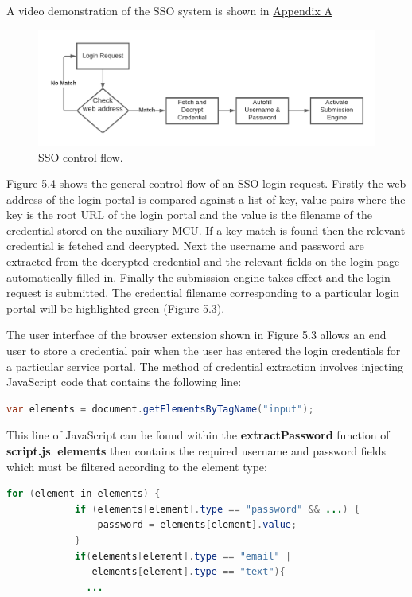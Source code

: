 A video demonstration of the SSO system is shown in \hyperref[sec:SystemOverview]{Appendix A}

\begin{figure}[H]
\centering
\includegraphics[width=0.9\columnwidth]{Figures/Fig_54.png}
\caption{SSO control flow.}
\label{fig:gantt}
\end{figure}

Figure 5.4 shows the general control flow of an SSO login request. Firstly the web address of the login portal is compared against a list of key, value pairs where the key is the root URL of the login portal and the value is the filename of the credential stored on the auxiliary MCU. If a key match is found then the relevant credential is fetched and decrypted. Next the username and password are extracted from the decrypted credential and the relevant fields on the login page automatically filled in. Finally the submission engine takes effect and the login request is submitted. The credential filename corresponding to a particular login portal will be highlighted green (Figure 5.3).

The user interface of the browser extension shown in Figure 5.3 allows an end user to store a credential pair when the user has entered the login credentials for a particular service portal. The method of credential extraction involves injecting JavaScript code that contains the following line:
\begin{lstlisting}[language=Java]
var elements = document.getElementsByTagName("input");
\end{lstlisting}

This line of JavaScript can be found within the \textbf{extractPassword} function of \textbf{script.js}.
\textbf{elements} then contains the required username and password fields which must be filtered according to the element type:
\begin{lstlisting}[language=Java]
 for (element in elements) {
            if (elements[element].type == "password" && ...) {
                password = elements[element].value;
            }
            if(elements[element].type == "email" | 
               elements[element].type == "text"){
              ... 
              
\end{lstlisting}

